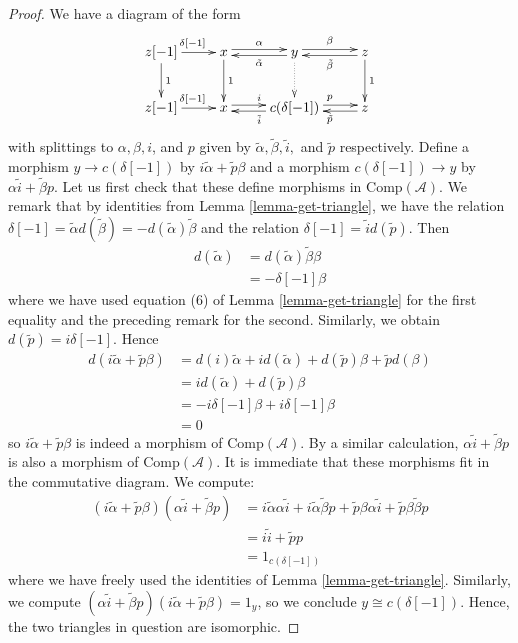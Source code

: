 \documentclass[10pt,a4paper]{amsart}
\theoremstyle{plain}
\theoremstyle{definition}
\theoremstyle{remark}
\numberwithin{equation}{subsection}
\begin{document}
\begin{proof}
We have a diagram of the form
$$
\xymatrix{
z[-1]\ar[r]^{\delta[-1]}\ar[d]^1 &
x\ar@<0.5ex>[r]^{\alpha}\ar[d]^1 &
y\ar@<0.5ex>[r]^{\beta}\ar@{.>}[d]\ar@<0.5ex>[l]^{\tilde{\alpha}} &
z\ar[d]^1\ar@<0.5ex>[l]^{\tilde\beta} \\
z[-1] \ar[r]^{\delta[-1]} &
x\ar@<0.5ex>[r]^i &
c(\delta[-1]) \ar@<0.5ex>[r]^p\ar@<0.5ex>[l]^{\tilde i} &
z\ar@<0.5ex>[l]^{\tilde p}
}
$$
with splittings to $\alpha, \beta, i$, and $p$ given by
$\tilde{\alpha}, \tilde{\beta}, \tilde{i},$ and $\tilde{p}$ respectively.
Define a morphism $y \to c(\delta[-1])$ by
$i\tilde{\alpha} + \tilde{p}\beta$ and a morphism
$c(\delta[-1]) \to y$ by $\alpha \tilde{i} + \tilde{\beta} p$.
Let us first check that these define morphisms in $\text{Comp}(\mathcal{A})$.
We remark that by identities from Lemma \ref{lemma-get-triangle},
we have the relation
$\delta[-1] = \tilde{\alpha}d(\tilde{\beta}) = -d(\tilde{\alpha})\tilde{\beta}$
and the relation $\delta[-1] = \tilde{i}d(\tilde{p})$. Then
\begin{align*}
d(\tilde{\alpha})
& =
d(\tilde{\alpha})\tilde{\beta}\beta \\
& =
-\delta[-1]\beta
\end{align*}
where we have used equation (6) of
Lemma \ref{lemma-get-triangle} for the first equality and
the preceding remark for the second. Similarly, we obtain
$d(\tilde{p}) = i\delta[-1]$. Hence
\begin{align*}
d(i\tilde{\alpha} + \tilde{p}\beta)
& =
d(i)\tilde{\alpha} + id(\tilde{\alpha}) +
d(\tilde{p})\beta + \tilde{p}d(\beta) \\
& =
id(\tilde{\alpha}) + d(\tilde{p})\beta \\
& =
-i\delta[-1]\beta + i\delta[-1]\beta \\
& =
0
\end{align*}
so $i\tilde{\alpha} + \tilde{p}\beta$ is indeed a morphism of
$\text{Comp}(\mathcal{A})$. By a similar calculation,
$\alpha \tilde{i} + \tilde{\beta} p$ is also a morphism of
$\text{Comp}(\mathcal{A})$. It is immediate that these morphisms
fit in the commutative diagram. We compute:
\begin{align*}
(i\tilde{\alpha} + \tilde{p}\beta)(\alpha \tilde{i} + \tilde{\beta} p)
& =
i\tilde{\alpha}\alpha\tilde{i} + i\tilde{\alpha}\tilde{\beta}p
+ \tilde{p}\beta\alpha\tilde{i} + \tilde{p}\beta\tilde{\beta}p \\
& =
i\tilde{i} + \tilde{p}p \\
& =
1_{c(\delta[-1])}
\end{align*}
where we have freely used the identities of
Lemma \ref{lemma-get-triangle}. Similarly, we compute
$(\alpha \tilde{i} + \tilde{\beta} p)(i\tilde{\alpha} + \tilde{p}\beta) = 1_y$,
so we conclude $y \cong c(\delta[-1])$. Hence, the two triangles in question
are isomorphic.
\end{proof}
\end{document}
